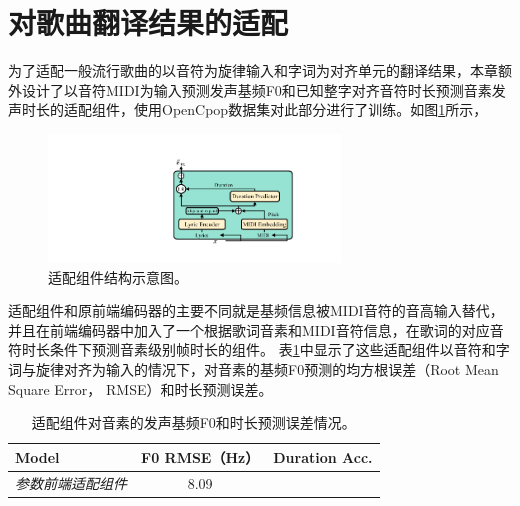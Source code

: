 \section{对歌曲翻译结果的适配}
为了适配一般流行歌曲的以音符为旋律输入和字词为对齐单元的翻译结果，本章额外设计了以音符MIDI为输入预测发声基频F0和已知整字对齐音符时长预测音素发声时长的适配组件，使用OpenCpop数据集对此部分进行了训练。如图\ref{fig:ada_encoder}所示，
\begin{figure}[!ht]
  \centering
	\includegraphics[width=0.69\textwidth]{figure/svs/ada_encoder.pdf}
	\caption{适配组件结构示意图。}
\label{fig:ada_encoder}
\end{figure}
适配组件和原前端编码器的主要不同就是基频信息被MIDI音符的音高输入替代，并且在前端编码器中加入了一个根据歌词音素和MIDI音符信息，在歌词的对应音符时长条件下预测音素级别帧时长的组件。
表\ref{tab:singing_obj}中显示了这些适配组件以音符和字词与旋律对齐为输入的情况下，对音素的基频F0预测的均方根误差（Root Mean Square Error， RMSE）和时长预测误差。
\begin{table}[!ht]
	\centering
	\setlength{\belowcaptionskip}{8pt} %
	\caption{适配组件对音素的发声基频F0和时长预测误差情况。}
	\begin{tabular}{|l|c|c|}
		\toprule
		Model &  F0 RMSE（Hz）& Duration Acc.  \\
		\midrule
		\textit{参数前端适配组件} & 8.09 & \\
		\bottomrule
	\end{tabular}
	\label{tab:singing_obj}
\end{table}


